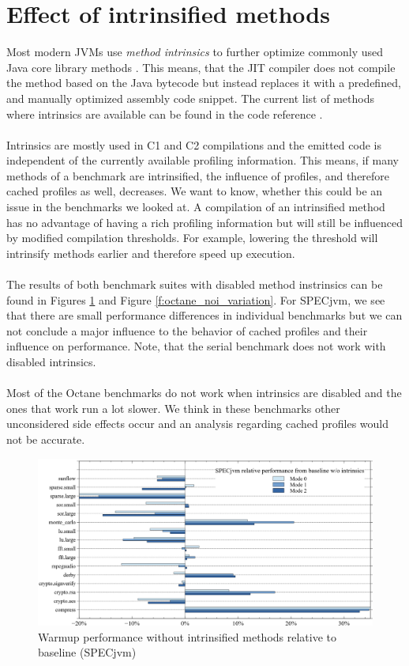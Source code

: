 \section{Effect of intrinsified methods}
\label{s:perf_intrinsics}
Most modern JVMs use \textit{method intrinsics} to further optimize commonly used Java core library methods \cite{intrinsics_talk}.
This means, that the JIT compiler does not compile the method based on the Java bytecode but instead replaces it with a predefined, and manually optimized assembly code snippet. The current list of methods where intrinsics are available can be found in the code reference \cite{code_intrinsics}.
\\\\
Intrinsics are mostly used in C1 and C2 compilations and the emitted code is independent of the currently available profiling information.
This means, if many methods of a benchmark are intrinsified, the influence of profiles, and therefore cached profiles as well, decreases.
We want to know, whether this could be an issue in the benchmarks we looked at. A compilation of an intrinsified method has no advantage of having a rich profiling information but will still be influenced by modified compilation thresholds. For example, lowering the threshold will intrinsify methods earlier and therefore speed up execution.
\\\\
The results of both benchmark suites with disabled method instrinsics can be found in Figures \ref{f:all_warmup_noi_variation} and Figure \ref{f:octane_noi_variation}.
For SPECjvm, we see that there are small performance differences in individual benchmarks but we can not conclude a major influence to the behavior of cached profiles and their influence on performance. Note, that the serial benchmark does not work with disabled intrinsics.
\\\\
Most of the Octane benchmarks do not work when intrinsics are disabled and the ones that work run a lot slower. We think in these benchmarks other unconsidered side effects occur and an analysis regarding cached profiles would not be accurate.
\begin{figure}[ht]
  \begin{center}
    \centering
    \includegraphics[width=1.0\textwidth]{figures/all_warmup_noi_variation.png}
    \caption{Warmup performance without intrinsified methods relative to baseline (SPECjvm)}
    \label{f:all_warmup_noi_variation}
  \end{center}
\end{figure}
